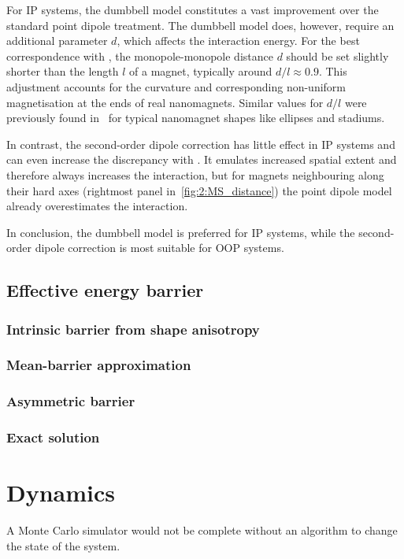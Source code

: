 For IP systems, the dumbbell model constitutes a vast improvement over the standard point dipole treatment.
The dumbbell model does, however, require an additional parameter $d$, which affects the interaction energy.
For the best correspondence with \mumax, the monopole-monopole distance $d$ should be set slightly shorter than the length $l$ of a magnet, typically around $d/l\approx0.9$.
This adjustment accounts for the curvature and corresponding non-uniform magnetisation at the ends of real nanomagnets.
Similar values for $d/l$ were previously found in~ for typical nanomagnet shapes like ellipses and stadiums. \par
In contrast, the second-order dipole correction has little effect in IP systems and can even increase the discrepancy with \mumax. It emulates increased spatial extent and therefore always increases the interaction, but for magnets neighbouring along their hard axes (rightmost panel in~\cref{fig:2:MS_distance}) the point dipole model already overestimates the interaction. \par
In conclusion, the dumbbell model is preferred for IP systems, while the second-order dipole correction is most suitable for OOP systems.

\subsection{Effective energy barrier}
\subsubsection{Intrinsic barrier from shape anisotropy}
\subsubsection{Mean-barrier approximation} %
\subsubsection{Asymmetric barrier}
\subsubsection{Exact solution} %

\section{Dynamics}\label{sec:2:Dynamics}
A Monte Carlo simulator would not be complete without an algorithm to change the state of the system.
